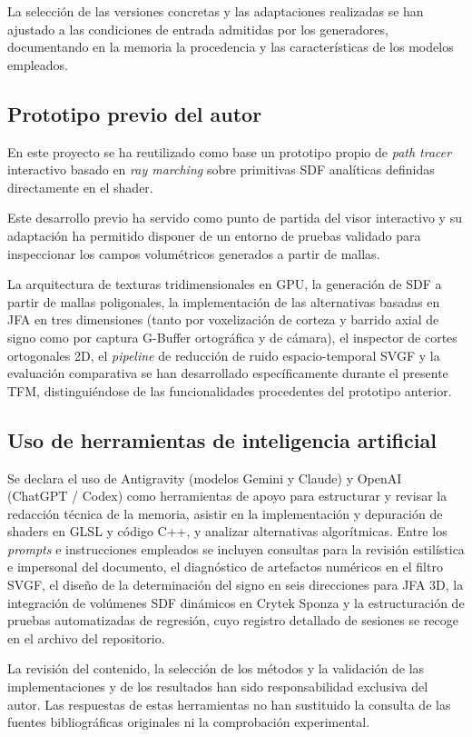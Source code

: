 La selección de las versiones concretas y las adaptaciones realizadas se han ajustado a las condiciones de entrada admitidas por los generadores, documentando en la memoria la procedencia y las características de los modelos empleados.

\subsection*{Prototipo previo del autor}

En este proyecto se ha reutilizado como base un prototipo propio de \textit{path tracer} interactivo basado en \textit{ray marching} sobre primitivas SDF analíticas definidas directamente en el shader.

Este desarrollo previo ha servido como punto de partida del visor interactivo y su adaptación ha permitido disponer de un entorno de pruebas validado para inspeccionar los campos volumétricos generados a partir de mallas.

La arquitectura de texturas tridimensionales en GPU, la generación de SDF a partir de mallas poligonales, la implementación de las alternativas basadas en JFA en tres dimensiones (tanto por voxelización de corteza y barrido axial de signo como por captura G-Buffer ortográfica y de cámara), el inspector de cortes ortogonales 2D, el \textit{pipeline} de reducción de ruido espacio-temporal SVGF y la evaluación comparativa se han desarrollado específicamente durante el presente TFM, distinguiéndose de las funcionalidades procedentes del prototipo anterior.

\subsection*{Uso de herramientas de inteligencia artificial}

Se declara el uso de Antigravity (modelos Gemini y Claude) y OpenAI (ChatGPT / Codex) como herramientas de apoyo para estructurar y revisar la redacción técnica de la memoria, asistir en la implementación y depuración de shaders en GLSL y código C++, y analizar alternativas algorítmicas. Entre los \textit{prompts} e instrucciones empleados se incluyen consultas para la revisión estilística e impersonal del documento, el diagnóstico de artefactos numéricos en el filtro SVGF, el diseño de la determinación del signo en seis direcciones para JFA 3D, la integración de volúmenes SDF dinámicos en Crytek Sponza y la estructuración de pruebas automatizadas de regresión, cuyo registro detallado de sesiones se recoge en el archivo  del repositorio.

La revisión del contenido, la selección de los métodos y la validación de las implementaciones y de los resultados han sido responsabilidad exclusiva del autor. Las respuestas de estas herramientas no han sustituido la consulta de las fuentes bibliográficas originales ni la comprobación experimental.
